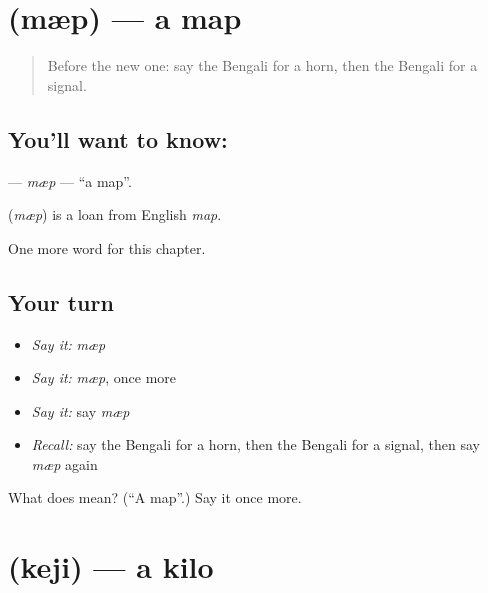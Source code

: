 \section[\texorpdfstring{\bn{ম্যাপ} (mæp)}{ম্যাপ (mæp)}]{ (mæp) — a map}

\label{lesson:BN-C205-mp}



\begin{quote}
Before the new one: say the Bengali for a horn, then the Bengali for a signal.
\end{quote}

\subsection*{You'll want to know: }
\textbf{} — \emph{mæp} — \textquotedblleft{}a map\textquotedblright{}.

\begin{cousinweb}
\textbf{} (\emph{mæp}) is a loan from English \emph{map}.
\end{cousinweb}

\begin{grammarlens}[title={What you've built}]
One more word for this chapter.
\end{grammarlens}

\subsection*{Your turn}
\begin{itemize}
\raggedright
  \item \emph{Say it:} \emph{mæp}
  \item \emph{Say it:} \emph{mæp}, once more
  \item \emph{Say it:} say \emph{mæp}
  \item \emph{Recall:} say the Bengali for a horn, then the Bengali for a signal, then say \emph{mæp} again
\end{itemize}

\begin{tcolorbox}[breakable,colback=teal!4,colframe=teal!35!black,title={Before you move on}]
What does  mean? (\textquotedblleft{}A map\textquotedblright{}.) Say it once more.
\end{tcolorbox}
\section[\texorpdfstring{\bn{কেজি} (keji)}{কেজি (keji)}]{ (keji) — a kilo}

